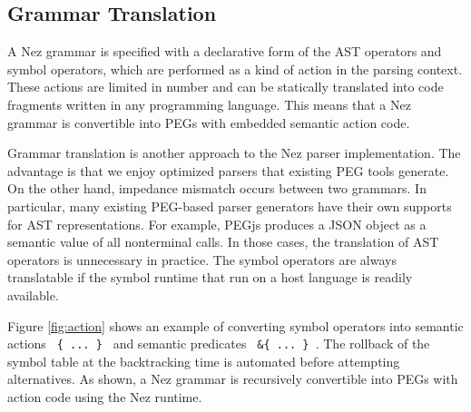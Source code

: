 \documentclass[preprint]{sigplanconf}
\begin{document}
\subsection{Grammar Translation}

A Nez grammar is specified with a declarative form of the AST operators and symbol operators, which are performed as a kind of action in the parsing context. These actions are limited in number and can be statically translated into code fragments written in any programming language. This means that a Nez grammar is convertible into PEGs 
with embedded semantic action code.  

Grammar translation is another approach to the Nez parser implementation. The advantage is that we enjoy optimized parsers that existing PEG tools generate.  On the other hand, impedance mismatch occurs between two grammars. In particular, many existing PEG-based parser generators have their own supports for AST representations. For example, PEGjs\cite{PEGjs} produces a JSON object as a semantic value of all nonterminal calls. In those cases, the translation of AST operators is unnecessary in practice. The symbol operators are always translatable if the symbol runtime that run on a host language is readily available.  

Figure \ref{fig:action} shows an example of converting symbol operators into  semantic actions \verb| { ... } | and semantic predicates \verb| &{ ... } |. The rollback of the symbol table at the backtracking time is automated before attempting alternatives. As shown, a Nez grammar is recursively convertible into PEGs with action code using the Nez runtime.
\end{document}
